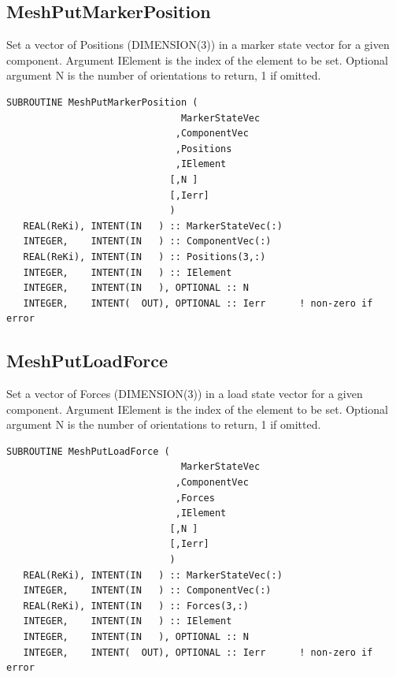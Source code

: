 \documentclass[11pt]{article}
\begin{document}
\subsection{MeshPutMarkerPosition}
Set a vector of Positions (DIMENSION(3)) in a marker state vector for a given component.
Argument IElement is the index of the element to be set.
Optional argument N is the number of orientations to return, 1 if omitted.
\begin{verbatim}
SUBROUTINE MeshPutMarkerPosition ( 
                               MarkerStateVec
                              ,ComponentVec 
                              ,Positions
                              ,IElement
                             [,N ]
                             [,Ierr]
                             )
   REAL(ReKi), INTENT(IN   ) :: MarkerStateVec(:)
   INTEGER,    INTENT(IN   ) :: ComponentVec(:)
   REAL(ReKi), INTENT(IN   ) :: Positions(3,:)
   INTEGER,    INTENT(IN   ) :: IElement
   INTEGER,    INTENT(IN   ), OPTIONAL :: N
   INTEGER,    INTENT(  OUT), OPTIONAL :: Ierr 		! non-zero if error
\end{verbatim}

\subsection{MeshPutLoadForce}
Set a vector of Forces (DIMENSION(3)) in a load state vector for a given component.
Argument IElement is the index of the element to be set.
Optional argument N is the number of orientations to return, 1 if omitted.
\begin{verbatim}
SUBROUTINE MeshPutLoadForce ( 
                               MarkerStateVec
                              ,ComponentVec 
                              ,Forces
                              ,IElement
                             [,N ]
                             [,Ierr]
                             )
   REAL(ReKi), INTENT(IN   ) :: MarkerStateVec(:)
   INTEGER,    INTENT(IN   ) :: ComponentVec(:)
   REAL(ReKi), INTENT(IN   ) :: Forces(3,:)
   INTEGER,    INTENT(IN   ) :: IElement
   INTEGER,    INTENT(IN   ), OPTIONAL :: N
   INTEGER,    INTENT(  OUT), OPTIONAL :: Ierr 		! non-zero if error
\end{verbatim}
\end{document}
